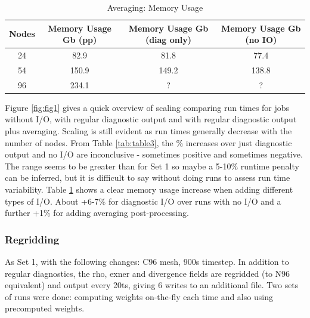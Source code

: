 \begin{table}[ht!]
\scriptsize
  \begin{center}
    \caption{Averaging: Memory Usage}
    \label{tab:table4}
     \begin{tabular}{|c|c|c|c|}
      \textbf{Nodes} & \textbf{Memory Usage Gb (pp) } & \textbf{Memory Usage Gb (diag only)} & \textbf{Memory Usage Gb (no IO)} \\
      \hline
      24 & 82.9 & 81.8 & 77.4 \\
      54 & 150.9 & 149.2 & 138.8 \\
      96 & 234.1 & ? & ? \\
    \end{tabular}
  \end{center}
\end{table}


Figure \ref{fig:fig1} gives a quick overview of scaling comparing run times for jobs without I/O, with regular diagnostic output and with
regular diagnostic output plus averaging. Scaling is still evident as run times generally decrease with the number of nodes. From
Table \ref{tab:table3}, the \% increases over just diagnostic output and no I/O are inconclusive - sometimes positive and sometimes negative. 
The range seems to be greater than for Set 1 so maybe a 5-10\% runtime penalty can be inferred, but it is difficult to say 
without doing runs to assess run time variability. Table \ref{tab:table4} shows a clear memory usage increase when adding different types of I/O. 
About +6-7\% for diagnostic I/O over runs with no I/O and a further +1\% for adding averaging post-processing. 


\subsubsection{Regridding}

As Set 1, with the following changes: C96 mesh, 900s timestep.
In addition to regular diagnostics, the rho, exner and divergence fields are regridded (to N96 equivalent) and output every 20ts, giving 6 writes to an additional file. Two sets of runs were done: computing weights on-the-fly each time and also using precomputed weights.


